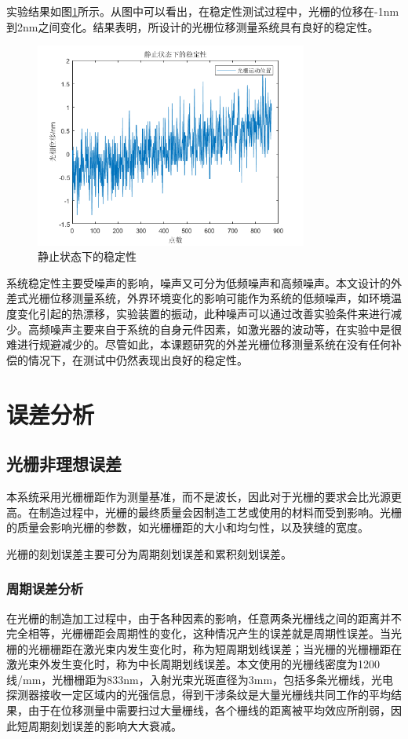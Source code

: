 \documentclass[type=master,oneside]{fduthesis}
\begin{document}
实验结果如图\ref{fig:静止状态下的稳定性}所示。从图中可以看出，在稳定性测试过程中，光栅的位移在-1nm到2nm之间变化。结果表明，所设计的光栅位移测量系统具有良好的稳定性。
\begin{figure}[htb]
  \centering
  \includegraphics[width=0.8\textwidth]{4-fig//静止状态下的稳定性.png}
  \caption{静止状态下的稳定性}
  \label{fig:静止状态下的稳定性}
\end{figure}

系统稳定性主要受噪声的影响，噪声又可分为低频噪声和高频噪声。本文设计的外差式光栅位移测量系统，外界环境变化的影响可能作为系统的低频噪声，如环境温度变化引起的热漂移，实验装置的振动，此种噪声可以通过改善实验条件来进行减少。高频噪声主要来自于系统的自身元件因素，如激光器的波动等，在实验中是很难进行规避减少的。尽管如此，本课题研究的外差光栅位移测量系统在没有任何补偿的情况下，在测试中仍然表现出良好的稳定性。

\section{误差分析}
\subsection{光栅非理想误差}
本系统采用光栅栅距作为测量基准，而不是波长，因此对于光栅的要求会比光源更高。在制造过程中，光栅的最终质量会因制造工艺或使用的材料而受到影响。光栅的质量会影响光栅的参数，如光栅栅距的大小和均匀性，以及狭缝的宽度。

光栅的刻划误差主要可分为周期刻划误差和累积刻划误差。
\subsubsection{周期误差分析}

在光栅的制造加工过程中，由于各种因素的影响，任意两条光栅线之间的距离并不完全相等，光栅栅距会周期性的变化，这种情况产生的误差就是周期性误差。当光栅的光栅栅距在激光束内发生变化时，称为短周期划线误差；当光栅的光栅栅距在激光束外发生变化时，称为中长周期划线误差。本文使用的光栅线密度为1200线/mm，光栅栅距为833nm，入射光束光斑直径为3mm，包括多条光栅线，光电探测器接收一定区域内的光强信息，得到干涉条纹是大量光栅线共同工作的平均结果，由于在位移测量中需要扫过大量栅线，各个栅线的距离被平均效应所削弱，因此短周期刻划误差的影响大大衰减。
\end{document}
